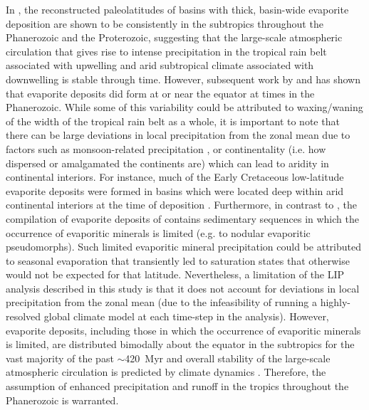 \documentclass[11pt,letterpaper]{article}
\begin{document}
In \citet{Evans2006a}, the reconstructed paleolatitudes of basins with thick, basin-wide evaporite deposition are shown to be consistently in the subtropics throughout the Phanerozoic and the Proterozoic, suggesting that the large-scale atmospheric circulation that gives rise to intense precipitation in the tropical rain belt associated with upwelling and arid subtropical climate associated with downwelling is stable through time. However, subsequent work by \citet{Boucot2013a} and \citet{Cao2018a} has shown that evaporite deposits did form at or near the equator at times in the Phanerozoic. While some of this variability could be attributed to waxing/waning of the width of the tropical rain belt as a whole, it is important to note that there can be large deviations in local precipitation from the zonal mean due to factors such as monsoon-related precipitation \citep{Trenberth2000a}, or continentality (i.e. how dispersed or amalgamated the continents are) which can lead to aridity in continental interiors. For instance, much of the Early Cretaceous low-latitude evaporite deposits were formed in basins which were located deep within arid continental interiors at the time of deposition \citep{Boucot2013a, Cao2018a}. Furthermore, in contrast to \citet{Evans2006a}, the compilation of evaporite deposits of \citet{Boucot2013a} contains sedimentary sequences in which the occurrence of evaporitic minerals is limited (e.g. to nodular evaporitic pseudomorphs). Such limited evaporitic mineral precipitation could be attributed to seasonal evaporation that transiently led to saturation states that otherwise would not be expected for that latitude. Nevertheless, a limitation of the LIP analysis described in this study is that it does not account for deviations in local precipitation from the zonal mean (due to the infeasibility of running a highly-resolved global climate model at each time-step in the analysis). However, evaporite deposits, including those in which the occurrence of evaporitic minerals is limited, are distributed bimodally about the equator in the subtropics for the vast majority of the past $\sim$420~Myr \citep{Cao2018a} and overall stability of the large-scale atmospheric circulation is predicted by climate dynamics \citep{Donohoe2017a}. Therefore, the assumption of enhanced precipitation and runoff in the tropics throughout the Phanerozoic is warranted.
\end{document}
